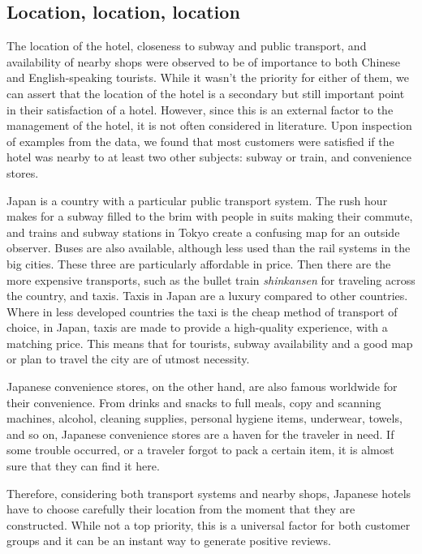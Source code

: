 \documentclass[review]{elsarticle}
\begin{document}
\subsection{Location, location, location}\label{disc:location}

The location of the hotel, closeness to subway and public transport, and availability of nearby shops were observed to be of importance to both Chinese and English-speaking tourists. While it wasn't the priority for either of them, we can assert that the location of the hotel is a secondary but still important point in their satisfaction of a hotel. However, since this is an external factor to the management of the hotel, it is not often considered in literature. Upon inspection of examples from the data, we found that most customers were satisfied if the hotel was nearby to at least two other subjects: subway or train, and convenience stores. 

Japan is a country with a particular public transport system. The rush hour makes for a subway filled to the brim with people in suits making their commute, and trains and subway stations in Tokyo create a confusing map for an outside observer. Buses are also available, although less used than the rail systems in the big cities. These three are particularly affordable in price. Then there are the more expensive transports, such as the bullet train \textit{shinkansen} for traveling across the country, and taxis. Taxis in Japan are a luxury compared to other countries. Where in less developed countries the taxi is the cheap method of transport of choice, in Japan, taxis are made to provide a high-quality experience, with a matching price. This means that for tourists, subway availability and a good map or plan to travel the city are of utmost necessity.

Japanese convenience stores, on the other hand, are also famous worldwide for their convenience. From drinks and snacks to full meals, copy and scanning machines, alcohol, cleaning supplies, personal hygiene items, underwear, towels, and so on, Japanese convenience stores are a haven for the traveler in need. If some trouble occurred, or a traveler forgot to pack a certain item, it is almost sure that they can find it here.

Therefore, considering both transport systems and nearby shops, Japanese hotels have to choose carefully their location from the moment that they are constructed. While not a top priority, this is a universal factor for both customer groups and it can be an instant way to generate positive reviews.
\end{document}
